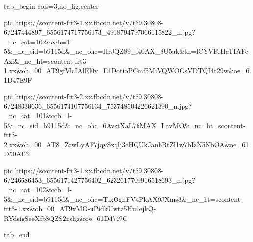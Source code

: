  
 
 
 
 


\ifcmt
  tab_begin cols=3,no_fig,center

     pic https://scontent-frt3-1.xx.fbcdn.net/v/t39.30808-6/247444897_6556174717756073_4918794797066115822_n.jpg?_nc_cat=102&ccb=1-5&_nc_sid=b9115d&_nc_ohc=HrJQZ89_f40AX_8U5ak&tn=lCYVFeHcTIAFcAzi&_nc_ht=scontent-frt3-1.xx&oh=00_AT9gfVlcIAlEl0v_E1DotioPCmf5MiVQWOOsVDTQI4t29w&oe=61D47E9F

     pic https://scontent-frt3-2.xx.fbcdn.net/v/t39.30808-6/248330636_6556174107756134_753748504226621390_n.jpg?_nc_cat=101&ccb=1-5&_nc_sid=b9115d&_nc_ohc=6AvztXaL76MAX_LavMO&_nc_ht=scontent-frt3-2.xx&oh=00_AT8_ZcwLyAF7jqySxqlj3eHQUkJanbRtZl1w7bIzN5NbOA&oe=61D50AF3

     pic https://scontent-frt3-1.xx.fbcdn.net/v/t39.30808-6/246686453_6556171427756402_6232617709916518693_n.jpg?_nc_cat=102&ccb=1-5&_nc_sid=b9115d&_nc_ohc=TixOgnFV4PkAX9JXms3&_nc_ht=scontent-frt3-1.xx&oh=00_AT9xMO-uPidkUwtz5Hu1ejkQ-RYdsigSeeXfb8QZS2nshg&oe=61D4749C

  tab_end
\fi
